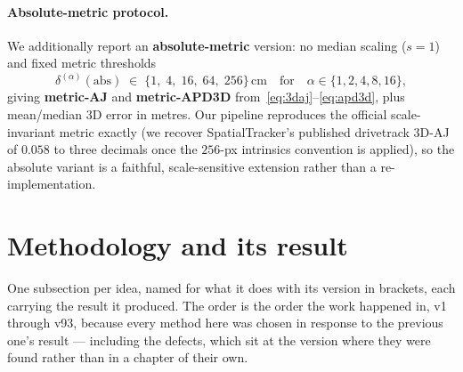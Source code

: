 \documentclass[11pt,a4paper]{article}
\begin{document}
\paragraph{Absolute-metric protocol.}
We additionally report an \textbf{absolute-metric} version: no median scaling ($s=1$) and
fixed metric thresholds
\begin{equation}
  \delta^{(\alpha)}(\text{abs})
  \;\in\;
  \{1,\;4,\;16,\;64,\;256\}\,\text{cm}
  \quad\text{for}\quad
  \alpha\in\{1,2,4,8,16\},
  \label{eq:thresh_abs}
\end{equation}
giving \textbf{metric-AJ} and \textbf{metric-APD3D} from~\eqref{eq:3daj}--\eqref{eq:apd3d},
plus mean/median 3D error in metres.
Our pipeline reproduces the official scale-invariant metric exactly
(we recover SpatialTracker's published drivetrack 3D-AJ of $0.058$ to three decimals
once the $256$-px intrinsics convention is applied), so the absolute variant is a
faithful, scale-sensitive extension rather than a re-implementation.

\section{Methodology and its result}
\label{sec:methodology}
One subsection per idea, named for what it does with its version in brackets, each carrying
the result it produced. The order is the order the work happened in, v1 through v93, because
every method here was chosen in response to the previous one's result --- including the
defects, which sit at the version where they were found rather than in a chapter of their own.
\end{document}
